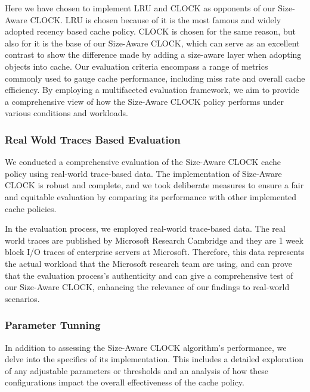 \documentclass[journal,10.5pt,onecolumn]{IEEEtran}
\begin{document}
Here we have chosen to implement LRU and CLOCK as opponents of our Size-Aware CLOCK. LRU is chosen because of it is the most famous and widely adopted recency based cache policy. CLOCK is chosen for the same reason, but also for it is the base of our Size-Aware CLOCK, which can serve as an excellent contrast to show the difference made by adding a size-aware layer when adopting objects into cache. Our evaluation criteria encompass a range of metrics commonly used to gauge cache performance, including miss rate and overall cache efficiency. By employing a multifaceted evaluation framework, we aim to provide a comprehensive view of how the Size-Aware CLOCK policy performs under various conditions and workloads.

\subsubsection{Real Wold Traces Based Evaluation}
We conducted a comprehensive evaluation of the Size-Aware CLOCK cache policy using real-world trace-based data. The implementation of Size-Aware CLOCK is robust and complete, and we took deliberate measures to ensure a fair and equitable evaluation by comparing its performance with other implemented cache policies.

In the evaluation process, we employed real-world trace-based data. The real world traces are published by Microsoft Research Cambridge and they are 1 week block I/O traces of enterprise servers at Microsoft. Therefore, this data represents the actual workload that the Microsoft research team are using, and can prove that the evaluation process's authenticity and can give a comprehensive test of our Size-Aware CLOCK, enhancing the relevance of our findings to real-world scenarios.

\subsubsection{Parameter Tunning}
In addition to assessing the Size-Aware CLOCK algorithm's performance, we delve into the specifics of its implementation. This includes a detailed exploration of any adjustable parameters or thresholds and an analysis of how these configurations impact the overall effectiveness of the cache policy.

\end{document}
